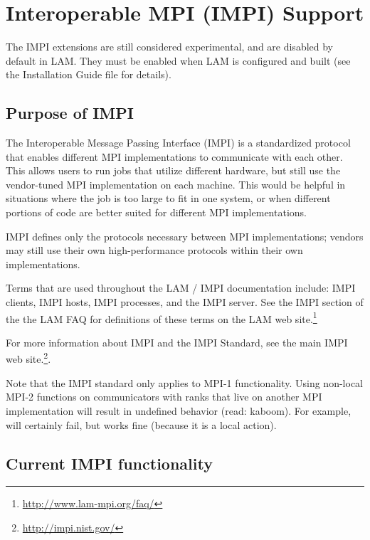 \section{Interoperable MPI (IMPI) Support}

The IMPI extensions are still considered experimental, and are
disabled by default in LAM.  They must be enabled when LAM is
configured and built (see the Installation Guide file for details).


\subsection{Purpose of IMPI}

The Interoperable Message Passing Interface (IMPI) is a standardized
protocol that enables different MPI implementations to communicate
with each other. This allows users to run jobs that utilize different
hardware, but still use the vendor-tuned MPI implementation on each
machine. This would be helpful in situations where the job is too
large to fit in one system, or when different portions of code are
better suited for different MPI implementations.

IMPI defines only the protocols necessary between MPI implementations;
vendors may still use their own high-performance protocols within
their own implementations.

Terms that are used throughout the LAM / IMPI documentation include:
IMPI clients, IMPI hosts, IMPI processes, and the IMPI server. See the
IMPI section of the the LAM FAQ for definitions of these terms on the
LAM web site.\footnote{\url{http://www.lam-mpi.org/faq/}}

For more information about IMPI and the IMPI Standard, see the main
IMPI web site.\footnote{\url{http://impi.nist.gov/}}.

Note that the IMPI standard only applies to MPI-1 functionality.
Using non-local MPI-2 functions on communicators with ranks that live
on another MPI implementation will result in undefined behavior (read:
kaboom).  For example,  will certainly
fail, but  works fine (because it
is a local action).


\subsection{Current IMPI functionality}

